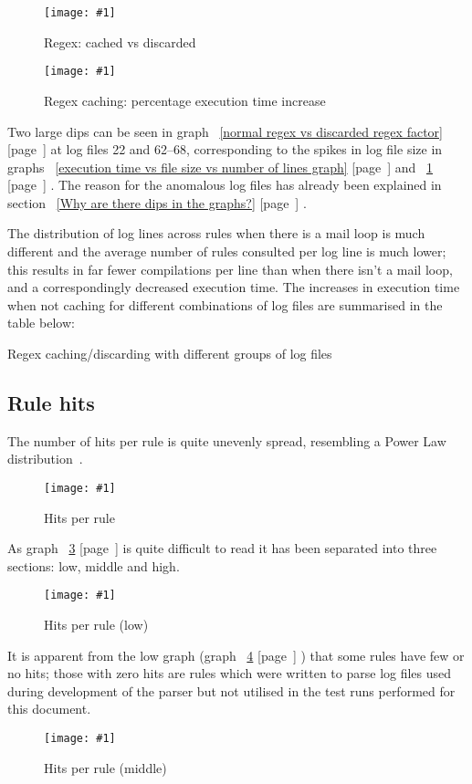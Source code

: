 \documentclass[a4paper,12pt,draft]{article}
\newcommand{\showgraph}[3]{
    \begin{figure}[hbt!]
        \caption{#2}\label{#3}
        \texttt{[image: \#1]}
    \end{figure}
}
\newcommand{\showtable}[3]{
    \begin{table}[ht]
        \caption{#2}\label{#3}
        
    \end{table}
}
\newcommand{\refwithpage}[1]{%
    \empty{}\ref{#1} [page~\pageref{#1}]%
}
\begin{document}
\showgraph{build/plot-cached-discarded}{Regex: cached vs
discarded}{normal regex vs discard regex}

\showgraph{build/plot-cached-discarded-factor}{Regex caching: percentage
execution time increase}{normal regex vs discarded regex factor}

Two large dips can be seen in graph~\refwithpage{normal regex vs discarded
regex factor} at log files 22 and 62--68, corresponding to the spikes in
log file size in graphs~\refwithpage{execution time vs file size vs number
of lines graph} and~\refwithpage{normal regex vs discard regex}.  The
reason for the anomalous log files has already been explained in
section~\refwithpage{Why are there dips in the graphs?}.

The distribution of log lines across rules when there is a mail loop is
much different and the average number of rules consulted per log line is
much lower; this results in far fewer \regex{} compilations per line than
when there isn't a mail loop, and a correspondingly decreased execution
time.  The increases in execution time when not caching \regexes{} for
different combinations of log files are summarised in the table below:

\showtable{build/stats-cached-discarded-include-for-graph}
{Regex caching/discarding with different groups of log files}
{Regex caching/discarding with different groups of log files}


\subsection{Rule hits}
\label{rule hits}

The number of hits per rule is quite unevenly spread, resembling a Power
Law distribution~\cite{powerlaw}.

\showgraph{build/plot-hits}{Hits per rule}{rule hits graph}

As graph~\refwithpage{rule hits graph} is quite difficult to read it has
been separated into three sections: low, middle and high.

\showgraph{build/plot-hits-low}{Hits per rule (low)}{hits per rule low}

It is apparent from the low graph (graph~\refwithpage{hits per rule low})
that some rules have few or no hits; those with zero hits are rules which
were written to parse log files used during development of the parser but
not utilised in the test runs performed for this document.

\showgraph{build/plot-hits-middle}{Hits per rule (middle)}{hits per rule
middle}
\end{document}
